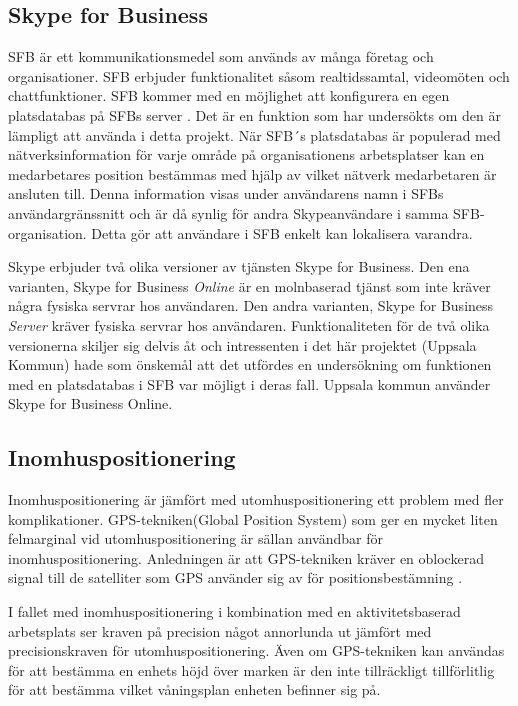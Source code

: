 \documentclass[swedish, a4paper,12pt]{article}
\begin{document}
\subsection{Skype for Business}
SFB är ett kommunikationsmedel som används av många företag och organisationer. SFB erbjuder funktionalitet såsom realtidssamtal, videomöten och chattfunktioner. SFB kommer med en möjlighet att konfigurera en egen platsdatabas på SFBs server \cite{Microsoft-Office}. Det är en funktion som har undersökts om den är lämpligt att använda i detta projekt. När SFB´s platsdatabas är populerad med nätverksinformation för varje område på organisationens arbetsplatser kan en medarbetares position bestämmas med hjälp av vilket nätverk medarbetaren är ansluten till. Denna information visas under användarens namn i SFBs användargränssnitt och är då synlig för andra Skypeanvändare i samma SFB-organisation. Detta gör att användare i SFB enkelt kan lokalisera varandra.

Skype erbjuder två olika versioner av tjänsten Skype for Business. Den ena varianten, Skype for Business \textit{Online} är en molnbaserad tjänst som inte kräver några fysiska servrar hos användaren\cite{SFBonline}.
Den andra varianten, Skype for Business \textit{Server} kräver fysiska servrar hos användaren\cite{SFBserver}. Funktionaliteten för de två olika versionerna skiljer sig delvis åt och intressenten i det här projektet (Uppsala Kommun) hade som önskemål att det utfördes en undersökning om funktionen med en platsdatabas i SFB var möjligt i deras fall. Uppsala kommun använder Skype for Business Online.

\subsection{Inomhuspositionering}
Inomhuspositionering är jämfört med utomhuspositionering ett problem med fler komplikationer. GPS-tekniken(Global Position System) som ger en mycket liten felmarginal vid utomhuspositionering är sällan användbar för inomhuspositionering. Anledningen är att GPS-tekniken kräver en oblockerad signal till de satelliter som GPS använder sig av för positionsbestämning \cite{GPS_US_ACCURACY}.

I fallet med inomhuspositionering i kombination med en aktivitetsbaserad arbetsplats ser kraven på precision något annorlunda ut jämfört med precisionskraven för utomhuspositionering. Även om GPS-tekniken kan användas för att bestämma en enhets höjd över marken är den inte tillräckligt tillförlitlig för att bestämma vilket våningsplan enheten befinner sig på.
\end{document}
